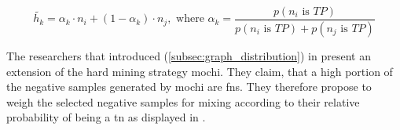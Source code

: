 \begin{equation}
    \tilde{h_k} =  \alpha_k \cdot n_i + (1-\alpha_k) \cdot  n_j, \text{ where } \alpha_k = \frac{p(n_i \text{ is } TP)}{p(n_i \text{ is } TP) + p(n_j \text{ is } TP)}
    \label{eq:progcl_mix}
\end{equation}

The researchers that introduced \progcl{} (\autoref{subsec:graph_distribution}) in \citet{progcl_2022} 
present an extension of the hard mining strategy \ac{mochi}. %
They claim, that a high portion of the negative samples generated by \ac{mochi} are \acp{fn}.
They therefore propose to weigh the selected negative samples for mixing 
according to their relative probability of being a \ac{tn} as displayed in .